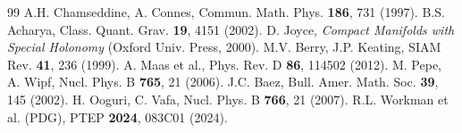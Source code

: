\documentclass[reprint,aps,prd,twocolumn,showkeys,nofootinbib]{revtex4-2}
\begin{document}
\begin{thebibliography}{99}
 A.H. Chamseddine, A. Connes, Commun. Math. Phys. \textbf{186}, 731 (1997).
 B.S. Acharya, Class. Quant. Grav. \textbf{19}, 4151 (2002).
 D. Joyce, {\it Compact Manifolds with Special Holonomy} (Oxford Univ. Press, 2000).
 M.V. Berry, J.P. Keating, SIAM Rev. \textbf{41}, 236 (1999).
 A. Maas et al., Phys. Rev. D \textbf{86}, 114502 (2012).
 M. Pepe, A. Wipf, Nucl. Phys. B \textbf{765}, 21 (2006).
 J.C. Baez, Bull. Amer. Math. Soc. \textbf{39}, 145 (2002).
 H. Ooguri, C. Vafa, Nucl. Phys. B \textbf{766}, 21 (2007).
 R.L. Workman et al. (PDG), PTEP \textbf{2024}, 083C01 (2024).
\end{thebibliography}
\end{document}
